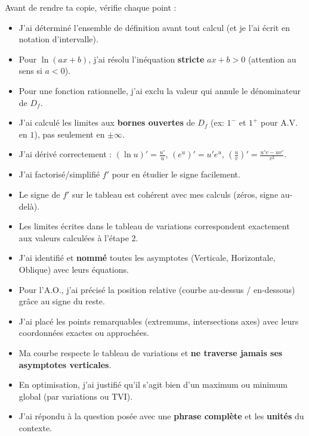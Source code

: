 \documentclass[11pt]{article}
\newcommand{\cle}[1]{{\popxbold\color{popdark}#1}}
\begin{document}
\begin{aretenir}
Avant de rendre ta copie, vérifie chaque point :
\begin{itemize}
  \item[$\square$] J'ai déterminé l'\cle{ensemble de définition} avant tout calcul (et je l'ai écrit en notation d'intervalle).
  \item[$\square$] Pour $\ln(ax+b)$, j'ai résolu l'inéquation \textbf{stricte} $ax+b>0$ (attention au sens si $a<0$).
  \item[$\square$] Pour une fonction rationnelle, j'ai exclu la valeur qui annule le dénominateur de $D_f$.
  \item[$\square$] J'ai calculé les limites aux \textbf{bornes ouvertes} de $D_f$ (ex: $1^-$ et $1^+$ pour A.V. en $1$), pas seulement en $\pm\infty$.
  \item[$\square$] J'ai dérivé correctement : $(\ln u)'=\frac{u'}{u}$, $(e^u)'=u'e^u$, $(\frac{u}{v})'=\frac{u'v-uv'}{v^2}$.
  \item[$\square$] J'ai factorisé/simplifié $f'$ pour en étudier le signe facilement.
  \item[$\square$] Le signe de $f'$ sur le tableau est cohérent avec mes calculs (zéros, signe au-delà).
  \item[$\square$] Les limites écrites dans le tableau de variations correspondent exactement aux valeurs calculées à l'étape 2.
  \item[$\square$] J'ai identifié et \textbf{nommé} toutes les asymptotes (Verticale, Horizontale, Oblique) avec leurs équations.
  \item[$\square$] Pour l'A.O., j'ai précisé la position relative (courbe au-dessus / en-dessous) grâce au signe du reste.
  \item[$\square$] J'ai placé les points remarquables (extremums, intersections axes) avec leurs coordonnées exactes ou approchées.
  \item[$\square$] Ma courbe respecte le tableau de variations et \textbf{ne traverse jamais ses asymptotes verticales}.
  \item[$\square$] En optimisation, j'ai justifié qu'il s'agit bien d'un maximum ou minimum global (par variations ou TVI).
  \item[$\square$] J'ai répondu à la question posée avec une \textbf{phrase complète} et les \textbf{unités} du contexte.
\end{itemize}
\end{aretenir}
\end{document}
